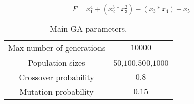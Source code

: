 \begin{equation}
\label{eq:fitness}
 F=x_{1}^{4} + (x_{2}^{3} * x_{3}^{2}) - (x_{3} * x_{4}) + x_{5} 
\end{equation}




\begin{table}
\renewcommand{\arraystretch}{1.3}
\centering
\tiny
\caption{Main GA parameters.}
\label{Table:par_ga}
\begin{tabular}{cc}
\hline
Max number of generations & $10000$ \\
Population sizes & $50$,$100$,$500$,$1000$ \\
Crossover probability & $0.8$ \\ 
Mutation probability & $0.15$ \\ 
\hline
\end{tabular}
\end{table} 
